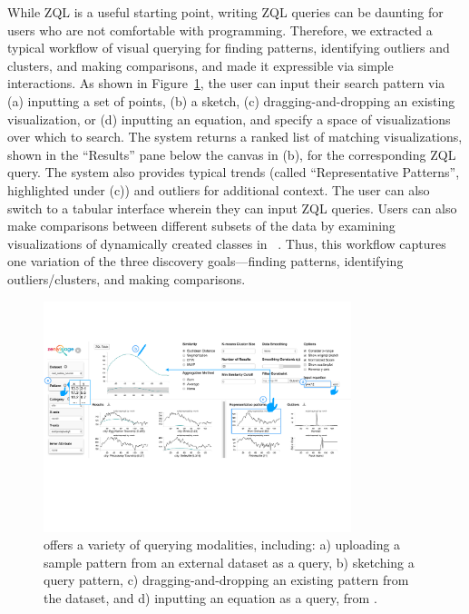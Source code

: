\par While ZQL is a useful starting point, writing ZQL
queries can be daunting for users who are not comfortable
with programming.
Therefore, we extracted a typical workflow
of visual querying for finding patterns, identifying
outliers and clusters, and making comparisons, and made it expressible
via simple interactions. As shown in Figure~\ref{fig:modalities}, the user can input their search pattern via (a) inputting a set of points,
(b) a sketch, (c) dragging-and-dropping an existing visualization,
or (d) inputting an equation, 
and specify a space of visualizations over which to search.
The system returns a ranked list of matching visualizations, shown in the ``Results'' pane below the canvas in (b), for the corresponding ZQL query.
The system also provides typical trends 
(called ``Representative Patterns'', highlighted under (c)) and outliers
for additional context. 
The user can also switch to a tabular interface wherein
they can input ZQL queries.  
Users can also make comparisons between different 
subsets of the data by examining visualizations 
of dynamically created classes in \zv~\cite{Lee2017}.
Thus, this workflow captures one variation of the three
discovery goals---finding patterns, identifying outliers/clusters,
and making comparisons. 
\begin{figure}[!t]
\centering
\vspace{-10pt}
\includegraphics[width=0.8\textwidth,frame]{figures/modalities.pdf}
\caption{\zv offers a variety of querying modalities, including: a) uploading a sample pattern from an external dataset as a query, b) sketching a query pattern, c) dragging-and-dropping an existing pattern from the dataset, and d) inputting an equation as a query, from \cite{Lee2017}.}
\label{fig:modalities}
\vspace{-10pt}
\end{figure}


